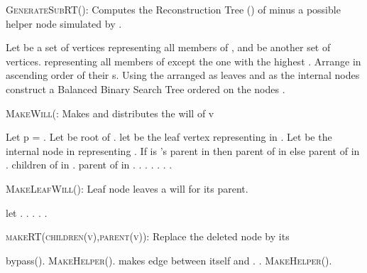 \documentclass[11pt]{article}
\begin{document}
  \begin{algorithm}[ph!]
\caption{\textsc{GenerateSubRT():} Computes  the Reconstruction Tree () of  minus a possible helper node
simulated by . }
\label{algo: genRT}
\begin{algorithmic}[1]
\STATE Let  be a set of vertices representing all members of , and  be another set of vertices.
representing  all members of  except the one with the highest .
\STATE Arrange  in ascending order of their s.
\STATE Using the arranged  as leaves and  as the internal nodes construct a  Balanced Binary Search Tree
  ordered on the nodes .
\RETURN 
\end{algorithmic}
\end{algorithm}

  \begin{algorithm}[ph!]
\caption{\textsc{MakeWill(:} Makes and distributes the will of v }
\label{algo: makewill}
\begin{algorithmic}[1]
\STATE Let p = . Let   be root of .
    \STATE let  be the leaf vertex representing  in . Let  be the internal node in  representing . 
    \STATE If  is 's parent in  then  parent of  in  else  parent of  in .
     \IF{ }
     \STATE  children of  in .   
     \STATE  parent of  in .  
       \ELSE
        \IF{}
          \STATE .
          \STATE .
\STATE .     
         \ELSE
                 \STATE .
                  \STATE .
                  \STATE .
         \ENDIF
     \ENDIF
\ENDFOR
\end{algorithmic}
\end{algorithm}

\begin{algorithm}[ph!]
\caption{\textsc{MakeLeafWill()}:  Leaf node leaves a will for its parent.}
\label{algo: makeleafwill}
\begin{algorithmic}[1]
\STATE let .
\IF{}
\STATE .
 \STATE . 
 \ELSE
\STATE .
\STATE .
\ENDIF
\end{algorithmic}
\end{algorithm}

  
\begin{algorithm}[ph!]
\caption{\textsc{makeRT(children(v),parent(v))}: Replace the deleted node by its  }
\label{algo: makeRT}
\begin{algorithmic}[1]
  \IF{}
  \STATE bypass().     
\STATE \textsc{MakeHelper}().
  \ELSE     
\STATE  makes edge between itself and .
\STATE .
\STATE \textsc{MakeHelper}().
\ENDIF
\ENDFOR 
\end{algorithmic}
\end{algorithm}
\end{document}
